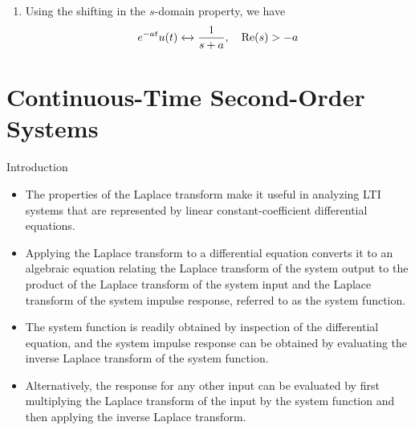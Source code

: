 \begin{frame}[allowframebreaks]{}
{\begin{enumerate}
              \begin{align*}
                tu(t) &\xleftrightarrow{}  -\frac{d}{ds}\left(\frac{1}{s}\right) = \frac{1}{s^2}, \quad \mathrm{Re}(s)>0\\
              \end{align*}
              \pause
          \item Using the shifting in the $s$-domain property, we have
              \begin{align*}
                e^{-at}u(t) &\xleftrightarrow{}  \frac{1}{s+a}, \quad \mathrm{Re}(s)>-a\\
              \end{align*}
        \end{enumerate}

    }
\end{frame}

\section{Continuous-Time Second-Order Systems}

\begin{frame}{Introduction}
    \begin{itemize}
        \item The properties of the Laplace transform make it useful in analyzing LTI systems that are represented by linear constant-coefficient differential equations.
        \item Applying the Laplace transform to a differential equation converts it to an algebraic equation relating the Laplace transform of the system output to the product of the Laplace transform of the system input and the Laplace transform of the system impulse response, referred to as the system function.
        \item The system function is readily obtained by inspection of the differential equation, and the system impulse response can be obtained by evaluating the inverse Laplace transform of the system function.
        \item Alternatively, the response for any other input can be evaluated by first multiplying the Laplace transform of the input by the system function and then applying the inverse Laplace transform.
    \end{itemize}
\end{frame}

